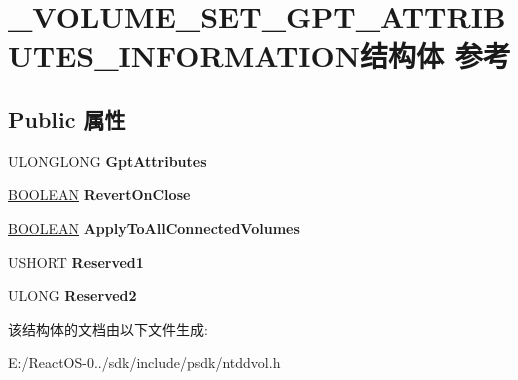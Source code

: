 \hypertarget{struct___v_o_l_u_m_e___s_e_t___g_p_t___a_t_t_r_i_b_u_t_e_s___i_n_f_o_r_m_a_t_i_o_n}{}\section{\+\_\+\+V\+O\+L\+U\+M\+E\+\_\+\+S\+E\+T\+\_\+\+G\+P\+T\+\_\+\+A\+T\+T\+R\+I\+B\+U\+T\+E\+S\+\_\+\+I\+N\+F\+O\+R\+M\+A\+T\+I\+O\+N结构体 参考}
\label{struct___v_o_l_u_m_e___s_e_t___g_p_t___a_t_t_r_i_b_u_t_e_s___i_n_f_o_r_m_a_t_i_o_n}
\subsection*{Public 属性}
\begin{DoxyCompactItemize}
\item 
\mbox{\label{struct___v_o_l_u_m_e___s_e_t___g_p_t___a_t_t_r_i_b_u_t_e_s___i_n_f_o_r_m_a_t_i_o_n_acd346dd56a73d308a1717212b702d426}} 
U\+L\+O\+N\+G\+L\+O\+NG {\bfseries Gpt\+Attributes}
\item 
\mbox{\label{struct___v_o_l_u_m_e___s_e_t___g_p_t___a_t_t_r_i_b_u_t_e_s___i_n_f_o_r_m_a_t_i_o_n_a995a7fd435d98492eb916735f33282cb}} 
\hyperlink{_processor_bind_8h_a112e3146cb38b6ee95e64d85842e380a}{B\+O\+O\+L\+E\+AN} {\bfseries Revert\+On\+Close}
\item 
\mbox{\label{struct___v_o_l_u_m_e___s_e_t___g_p_t___a_t_t_r_i_b_u_t_e_s___i_n_f_o_r_m_a_t_i_o_n_a67ec9c67b9b2fc11af172be5cf350790}} 
\hyperlink{_processor_bind_8h_a112e3146cb38b6ee95e64d85842e380a}{B\+O\+O\+L\+E\+AN} {\bfseries Apply\+To\+All\+Connected\+Volumes}
\item 
\mbox{\label{struct___v_o_l_u_m_e___s_e_t___g_p_t___a_t_t_r_i_b_u_t_e_s___i_n_f_o_r_m_a_t_i_o_n_ae897a5b702e9e1e22582a8ca1991516a}} 
U\+S\+H\+O\+RT {\bfseries Reserved1}
\item 
\mbox{\label{struct___v_o_l_u_m_e___s_e_t___g_p_t___a_t_t_r_i_b_u_t_e_s___i_n_f_o_r_m_a_t_i_o_n_a49d7c5b7f2d443199db5e35e89063e1f}} 
U\+L\+O\+NG {\bfseries Reserved2}
\end{DoxyCompactItemize}


该结构体的文档由以下文件生成\+:\begin{DoxyCompactItemize}
\item 
E\+:/\+React\+O\+S-\/0../sdk/include/psdk/ntddvol.\+h\end{DoxyCompactItemize}

